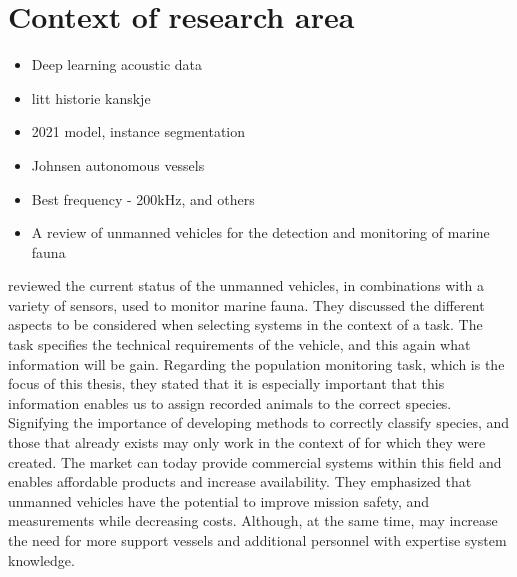 \section{Context of research area}
    \begin{itemize}
        \item Deep learning acoustic data
        \item litt historie kanskje 
        \item 2021 model, instance segmentation
        
        \item Johnsen autonomous vessels
        \item Best frequency - 200kHz, and others
        \item A review of unmanned vehicles for the detection and monitoring of marine fauna
        
    \end{itemize}
    
    
    
    
        \citeauthor{VERFUSS201917} \citeyear{VERFUSS201917}\cite{VERFUSS201917} reviewed the current status of the unmanned vehicles, in combinations with a variety of sensors, used to monitor marine fauna. They discussed the different aspects to be considered when selecting systems in the context of a task. The task specifies the technical requirements of the vehicle, and this again what information will be gain. Regarding the population monitoring task, which is the focus of this thesis, they stated that it is especially important that this information enables us to assign recorded animals to the correct species. Signifying the importance of developing methods to correctly classify species, and those that already exists may only work in the context of for which they were created. The market can today provide commercial systems within this field and enables affordable products and increase availability. They emphasized that unmanned vehicles have the potential to improve mission safety, and measurements while decreasing costs. Although, at the same time, may increase the need for more support vessels and additional personnel with expertise system knowledge.  
 
